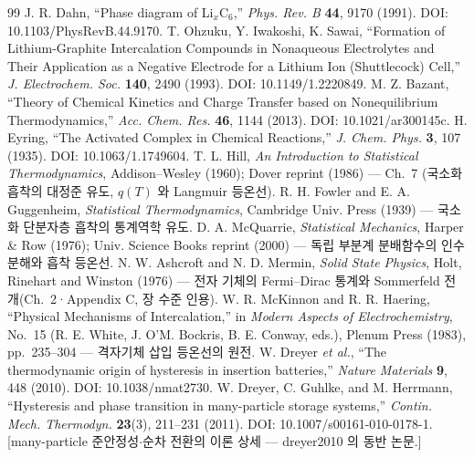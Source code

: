 \begin{thebibliography}{99}
 J. R. Dahn, ``Phase diagram of Li$_x$C$_6$,'' \emph{Phys. Rev. B} \textbf{44}, 9170 (1991). DOI: 10.1103/PhysRevB.44.9170.
 T. Ohzuku, Y. Iwakoshi, K. Sawai, ``Formation of Lithium-Graphite Intercalation Compounds in Nonaqueous Electrolytes and Their Application as a Negative Electrode for a Lithium Ion (Shuttlecock) Cell,'' \emph{J. Electrochem. Soc.} \textbf{140}, 2490 (1993). DOI: 10.1149/1.2220849.
 M. Z. Bazant, ``Theory of Chemical Kinetics and Charge Transfer based on Nonequilibrium Thermodynamics,'' \emph{Acc. Chem. Res.} \textbf{46}, 1144 (2013). DOI: 10.1021/ar300145c.
 H. Eyring, ``The Activated Complex in Chemical Reactions,'' \emph{J. Chem. Phys.} \textbf{3}, 107 (1935). DOI: 10.1063/1.1749604.
 T. L. Hill, \emph{An Introduction to Statistical Thermodynamics}, Addison--Wesley (1960); Dover reprint (1986) --- Ch.~7 (국소화 흡착의 대정준 유도, $q(T)$ 와 Langmuir 등온선).
 R. H. Fowler and E. A. Guggenheim, \emph{Statistical Thermodynamics}, Cambridge Univ. Press (1939) --- 국소화 단분자층 흡착의 통계역학 유도.
 D. A. McQuarrie, \emph{Statistical Mechanics}, Harper \& Row (1976); Univ. Science Books reprint (2000) --- 독립 부분계 분배함수의 인수분해와 흡착 등온선.
 N. W. Ashcroft and N. D. Mermin, \emph{Solid State Physics}, Holt, Rinehart and Winston (1976) --- 전자 기체의 Fermi--Dirac 통계와 Sommerfeld 전개(Ch.~2·Appendix C, 장 수준 인용).
 W. R. McKinnon and R. R. Haering, ``Physical Mechanisms of Intercalation,'' in \emph{Modern Aspects of Electrochemistry}, No.~15 (R. E. White, J. O'M. Bockris, B. E. Conway, eds.), Plenum Press (1983), pp.~235--304 --- 격자기체 삽입 등온선의 원전.
 W. Dreyer \emph{et al.}, ``The thermodynamic origin of hysteresis in insertion batteries,'' \emph{Nature Materials} \textbf{9}, 448 (2010). DOI: 10.1038/nmat2730.
 W. Dreyer, C. Guhlke, and M. Herrmann, ``Hysteresis and phase transition in many-particle storage systems,'' \emph{Contin. Mech. Thermodyn.} \textbf{23}(3), 211--231 (2011). DOI: 10.1007/s00161-010-0178-1. [many-particle 준안정성$\cdot$순차 전환의 이론 상세 --- dreyer2010 의 동반 논문.]

\end{thebibliography}
